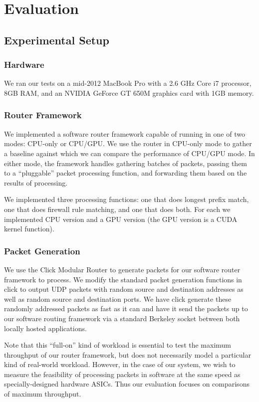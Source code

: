 \section{Evaluation}
\label{sec:eval}

\subsection{Experimental Setup}

\subsubsection{Hardware}

We ran our tests on a mid-2012 MacBook Pro with a 2.6 GHz Core i7 processor,
8GB RAM, and an NVIDIA GeForce GT 650M graphics card with 1GB memory.


\subsubsection{Router Framework}

We implemented a software router framework capable of running in one of two
modes: CPU-only or CPU/GPU. We use the router in CPU-only mode to gather a
baseline against which we can compare the performance of CPU/GPU mode. In
either mode, the framework handles gathering batches of packets, passing them
to a ``pluggable'' packet processing function, and forwarding them based on the
results of processing. 

We implemented three processing functions: one that does longest prefix match,
one that does firewall rule matching, and one that does both. For each we
implemented CPU version and a GPU version (the GPU version is a CUDA kernel
function).

\subsubsection{Packet Generation}
We use the Click Modular Router \cite{kohler2000click} to generate packets for our
software router framework to process. We modify the standard packet generation
functions in click to output UDP packets with random source and destination
addresses as well as random source and destination ports. We have click generate
these randomly addressed packets as fast as it can and have it send the packets
up to our software routing framework via a standard Berkeley socket between both
locally hosted applications.

Note that this ``full-on'' kind of workload is essential to test the maximum
throughput of our router framework, but does not necessarily model a particular
kind of real-world workload. However, in the case of our system, we wish to
measure the feasibility of processing packets in software at the same speed as
specially-designed hardware ASICs. Thus our evaluation focuses on comparisons
of maximum throughput.

